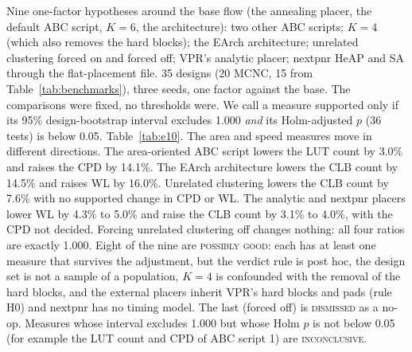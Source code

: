 Nine one-factor hypotheses around the base flow (the annealing placer, the default ABC script, $K=6$, the  architecture): two other ABC scripts; $K=4$ (which also removes the hard blocks); the EArch architecture; unrelated clustering forced on and forced off; VPR's analytic placer; nextpnr HeAP and SA through the flat-placement file.
 35 designs (20 MCNC, 15 from Table~\ref{tab:benchmarks}), three seeds, one factor against the base. The comparisons were fixed, no thresholds were. We call a measure supported only if its 95\% design-bootstrap interval excludes 1.000 \emph{and} its Holm-adjusted $p$ (36 tests) is below 0.05.
 Table~\ref{tab:e10}. The area and speed measures move in different directions. The area-oriented ABC script lowers the LUT count by 3.0\% and raises the CPD by 14.1\%. The EArch architecture lowers the CLB count by 14.5\% and raises WL by 16.0\%. Unrelated clustering lowers the CLB count by 7.6\% with no supported change in CPD or WL. The analytic and nextpnr placers lower WL by 4.3\% to 5.0\% and raise the CLB count by 3.1\% to 4.0\%, with the CPD not decided. Forcing unrelated clustering off changes nothing: all four ratios are exactly 1.000. %
 Eight of the nine are \textsc{possibly good}: each has at least one measure that survives the adjustment, but the verdict rule is post hoc, the design set is not a sample of a population, $K=4$ is confounded with the removal of the hard blocks, and the external placers inherit VPR's hard blocks and pads (rule H0) and nextpnr has no timing model. The last (forced off) is \textsc{dismissed} as a no-op. Measures whose interval excludes 1.000 but whose Holm $p$ is not below 0.05 (for example the LUT count and CPD of ABC script 1) are \textsc{inconclusive}.

